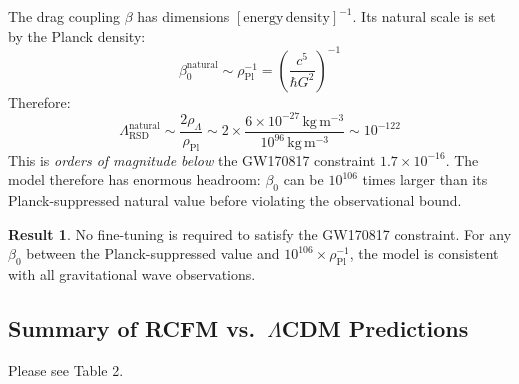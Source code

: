 \documentclass[10pt,twocolumn]{article}
\theoremstyle{definition}
\newtheorem{result}{Result}
\begin{document}
The drag coupling \( \beta \) has dimensions
\( [\mathrm{energy\,density}]^{-1} \).  Its natural scale is
set by the Planck density:
\begin{equation}
  \beta_{0}^{\mathrm{natural}} \sim \rho_{\mathrm{Pl}}^{-1}
    = \left(\frac{c^{5}}{\hbar G^{2}}\right)^{-1}
\end{equation}
Therefore:
\begin{equation}
  \Lambda_{\mathrm{RSD}}^{\mathrm{natural}}
    \sim \frac{2\rho_{\Lambda}}{\rho_{\mathrm{Pl}}}
    \sim 2\times\frac{6\times10^{-27}\,\mathrm{kg\,m^{-3}}}
                     {10^{96}\,\mathrm{kg\,m^{-3}}}
    \sim 10^{-122}
\end{equation}
This is \emph{orders of magnitude below} the GW170817
constraint $1.7\times10^{-16}$.  The model therefore has
enormous headroom: \( \beta_{0} \) can be $10^{106}$ times
larger than its Planck-suppressed natural value before
violating the observational bound.

\begin{result}
No fine-tuning is required to satisfy the GW170817
constraint.  For any \( \beta_{0} \) between the
Planck-suppressed value and $10^{106}\times\rho_{\mathrm{Pl}}^{-1}$,
the model is consistent with all gravitational wave
observations.
\end{result}


\subsection{Summary of RCFM vs.\ $\Lambda$CDM Predictions}  

Please see Table 2.
\end{document}
